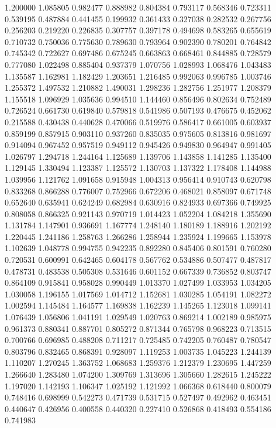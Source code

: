 1.200000
1.085805
0.982477
0.888982
0.804384
0.793117
0.568346
0.723311
0.539195
0.487884
0.441455
0.199932
0.361433
0.327038
0.282532
0.267756
0.256203
0.219220
0.226835
0.307757
0.397178
0.494698
0.583265
0.655619
0.710732
0.750036
0.775630
0.789630
0.793964
0.902390
0.780201
0.764842
0.745342
0.722627
0.697486
0.675245
0.663863
0.668461
0.844885
0.728579
0.777080
1.022498
0.885404
0.937379
1.070756
1.028993
1.068476
1.043483
1.135587
1.162981
1.182429
1.203651
1.216485
0.992063
0.996785
1.003746
1.255372
1.497532
1.210882
1.490031
1.298236
1.282756
1.251977
1.208379
1.155518
1.096929
1.035636
0.994510
1.144460
0.856496
0.802634
0.752489
0.726524
0.661730
0.619840
0.579818
0.541986
0.507193
0.476675
0.452062
0.215588
0.430438
0.440628
0.470066
0.519976
0.586417
0.661005
0.603937
0.859199
0.857915
0.903110
0.937260
0.835035
0.975605
0.813816
0.981697
0.914094
0.967452
0.957519
0.949112
0.945426
0.949830
0.964947
0.991405
1.026797
1.294718
1.244164
1.125689
1.139706
1.143858
1.141285
1.135400
1.129145
1.330494
1.123387
1.125572
1.130703
1.137322
1.178408
1.144988
1.039956
1.121762
1.091658
0.915948
1.004313
0.956414
0.910743
0.620798
0.833268
0.866288
0.776007
0.752966
0.672206
0.468021
0.858097
0.671748
0.652640
0.635941
0.624249
0.682984
0.630916
0.824933
0.697366
0.749925
0.808058
0.866325
0.921143
0.970719
1.014423
1.052204
1.084218
1.355690
1.131784
1.147901
0.936691
1.167774
1.248140
1.180189
1.188916
1.202192
1.220445
1.241186
1.258763
1.266286
1.258944
1.235924
1.199665
1.153978
1.102639
1.048778
0.994755
0.942235
0.892280
0.845406
0.801591
0.760280
0.720531
0.600991
0.642465
0.604178
0.567762
0.534886
0.507477
0.487817
0.478731
0.483538
0.505308
0.531646
0.601152
0.667339
0.736852
0.803747
0.864109
0.915841
0.958028
0.990449
1.013370
1.027499
1.033953
1.034205
1.030058
1.196155
1.017569
1.014712
1.152681
1.030285
1.054191
1.082272
1.002594
1.145484
1.164577
1.169838
1.162239
1.145265
1.123018
1.099141
1.076439
1.056806
1.041191
1.029549
1.020763
0.869214
1.002189
0.985975
0.961373
0.880341
0.887701
0.805272
0.871344
0.765798
0.968223
0.713515
0.700766
0.696985
0.488208
0.711217
0.725485
0.742205
0.760487
0.780547
0.803796
0.832465
0.868391
0.928097
1.119253
1.003735
1.045223
1.244139
1.110207
1.270245
1.363752
1.068683
1.259376
1.212379
1.230695
1.447259
1.266640
1.283480
1.074200
1.309769
1.313696
1.305660
1.282615
1.245222
1.197020
1.142193
1.106347
1.025192
1.121992
1.066368
0.618440
0.800079
0.748416
0.698999
0.542273
0.471739
0.531715
0.527497
0.492962
0.463451
0.440647
0.426956
0.400558
0.440320
0.227410
0.526868
0.418493
0.554186
0.741983

